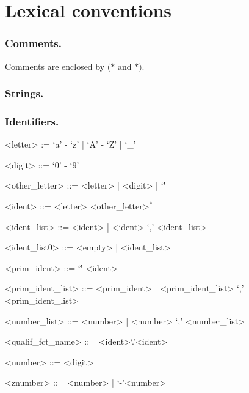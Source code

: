 
\section{Lexical conventions}


\newenvironment{ecgrammar}{\bgroup\framed\grammar}{\endgrammar\endframed\egroup}

\setlength{\grammarindent}{8em} %



\subsubsection*{Comments.}
Comments are enclosed by $(*$ and $*)$.


\subsubsection*{Strings.}


\subsubsection*{Identifiers.}

\begin{ecgrammar}
<letter> := `a' - `z' | `A' - `Z' | `_'

<digit> ::= `0' - `9'

<other_letter> ::= <letter> | <digit> | `\''

<ident> ::= <letter> <other_letter>$^*$

<ident_list> ::=  <ident> | <ident> `,'  <ident_list>

<ident_list0> ::= <empty> | <ident_list>

<prim_ident> ::= `\'' <ident>

<prim_ident_list> ::= <prim_ident> | <prim_ident_list> `,' <prim_ident_list>

<number_list> ::= <number> | <number> `,' <number_list>

<qualif_fct_name>  ::= <ident>`.'<ident>

<number> ::= <digit>$^+$

<znumber> ::= <number> | `-'<number>
\end{ecgrammar}

